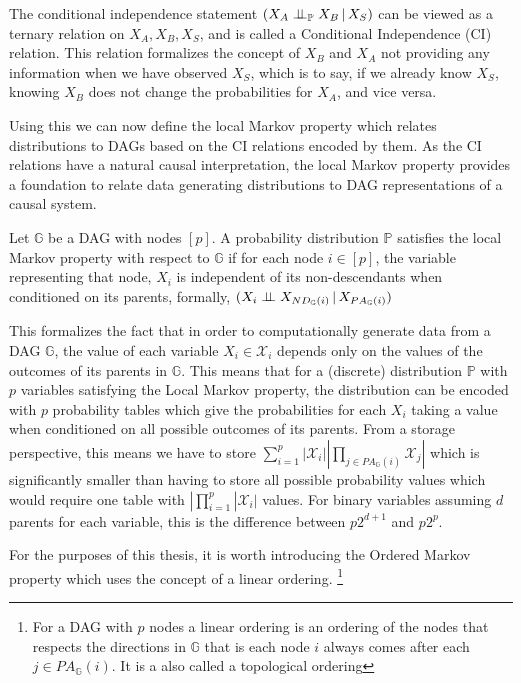\documentclass{tufte-book}
\begin{document}
The conditional independence statement \((X_A \perp \!\!\! \perp_{\mathbb{P}} X_B \,|\,X_S)\) can be viewed as a ternary relation on \(X_A,X_B,X_S\), and is called a Conditional Independence (CI) relation. This relation formalizes the concept of \(X_B\) and \(X_A\) not providing any information when we have observed \(X_S\), which is to say, if we already know \(X_S\), knowing \(X_B\) does not change the probabilities for \(X_A\), and vice versa.


Using this we can now define the local Markov property which relates distributions to DAGs based on the CI relations encoded by them. As the CI relations have a natural causal interpretation, the local Markov property provides a foundation to relate data generating distributions to DAG representations of a causal system.


\begin{definition}\label{thm:localmarkovdag}
Let $\mathbb{G}$ be a DAG with nodes $[p]$. A probability distribution $\mathbb{P}$ satisfies the local Markov property with respect to $\mathbb{G}$ if for each node $i \in [p]$, the variable representing that node, $X_i$ is independent of its non-descendants when conditioned on its parents, formally, $(X_i \perp \!\!\! \perp X_{ND_{\mathbb{G}}(i)}\,|\,X_{PA_{\mathbb{G}}(i)})$
\end{definition}

This formalizes the fact that in order to computationally generate data from a DAG \(\mathbb{G}\), the value of each variable \(X_i \in \mathcal{X}_i\) depends only on the values of the outcomes of its parents in \(\mathbb{G}\). This means that for a (discrete) distribution \(\mathbb{P}\) with \(p\) variables satisfying the Local Markov property, the distribution can be encoded with \(p\) probability tables which give the probabilities for each \(X_i\) taking a value when conditioned on all possible outcomes of its parents. From a storage perspective, this means we have to store \(\sum_{i=1}^p |\mathcal{X}_i| |\prod_{j \in PA_{\mathbb{G}}(i)}\mathcal{X}_j |\) which is significantly smaller than having to store all possible probability values which would require one table with \(|\prod_{i=1}^p |\mathcal{X}_i|\) values. For binary variables assuming \(d\) parents for each variable, this is the difference between \(p2^{d+1}\) and \(p2^p\).


For the purposes of this thesis, it is worth introducing the Ordered Markov property which uses the concept of a linear ordering.  \footnote{For a DAG  with $p$ nodes a linear ordering is an ordering of the nodes that respects the directions in $\mathbb{G}$ that is each node $i$ always comes after each $j \in PA_{\mathbb{G}}(i)$. It is a also called a topological ordering} 
\end{document}
